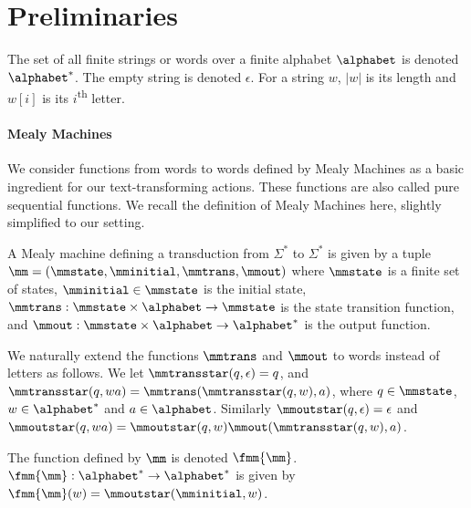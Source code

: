 
\section{Preliminaries}\label{sec:preliminaries-strings}

The set of all finite strings or words over a finite alphabet $\alphabet$ is denoted $\alphabet^\ast$. The empty string is denoted $\epsilon$. For a string $w$, $|w|$ is its length and $w[i]$ is its $i$\textsuperscript{th} letter.

\paragraph*{Mealy Machines} We consider functions from words to words defined by Mealy Machines as a basic ingredient for our text-transforming actions. These functions are also called pure sequential functions. We recall the definition of Mealy Machines here, slightly simplified to our setting. 

A Mealy machine defining a transduction from $\Sigma^\ast$ to $\Sigma^\ast$ is given by a tuple $\mm = (\mmstate, \mminitial, \mmtrans, \mmout)$ where $\mmstate$ is a finite set of states, $\mminitial \in \mmstate$ is the initial state, $\mmtrans : \mmstate \times \alphabet \to \mmstate$ is the state transition function, and $\mmout : \mmstate \times \alphabet \to \alphabet^\ast$ is the output function.

We naturally extend the functions $\mmtrans$ and $\mmout$ to words instead of letters as follows. We let $\mmtransstar(q,\epsilon) = q$, and  $\mmtransstar(q, wa) = \mmtrans(\mmtransstar(q,w), a)$, where $q \in \mmstate$, $w \in \alphabet^\ast$ and $a \in \alphabet$. Similarly $\mmoutstar(q,\epsilon) = \epsilon$ and $\mmoutstar(q,wa) = \mmoutstar(q,w)\mmout(\mmtransstar(q,w),a)$.

The function defined by $\mm$ is denoted $\fmm{\mm}$. $\fmm{\mm}: \alphabet^\ast \to \alphabet^\ast$ is given by $\fmm{\mm}(w) = \mmoutstar(\mminitial, w)$.
